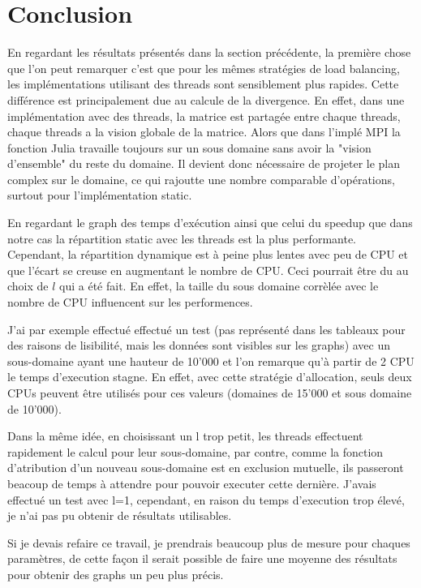\documentclass[12pt,a4paper,oneside, titlepage]{report}
\begin{document}
	\section*{Conclusion}

		En regardant les résultats présentés dans la section précédente, la première chose que l'on peut remarquer c'est que pour les mêmes stratégies de load balancing, les implémentations utilisant des threads sont sensiblement plus rapides.
		Cette différence est principalement due au calcule de la divergence. En effet, dans une implémentation avec des threads, la matrice est partagée entre chaque threads, chaque threads a la vision globale de la matrice. Alors que dans l'implé MPI la fonction Julia travaille toujours sur un sous domaine sans avoir la "vision d'ensemble" du reste du domaine. Il devient donc nécessaire de projeter le plan complex sur le domaine, ce qui rajoutte une nombre comparable d'opérations, surtout pour l'implémentation static.

		En regardant le graph des temps d'exécution ainsi que celui du speedup que dans notre cas la répartition static avec les threads est la plus performante. Cependant, la répartition dynamique est à peine plus lentes avec peu de CPU et que l'écart se creuse en augmentant le nombre de CPU.
		Ceci pourrait être du au choix de $l$ qui a été fait. En effet, la taille du sous domaine corrèlée avec le nombre de CPU influencent sur les performences.

		J'ai par exemple effectué effectué un test (pas représenté dans les tableaux pour des raisons de lisibilité, mais les données sont visibles sur les graphs) avec un sous-domaine ayant une hauteur de 10'000 et l'on remarque qu'à partir de 2 CPU le temps d'execution stagne. En effet, avec cette stratégie d'allocation, seuls deux CPUs peuvent être utilisés pour ces valeurs (domaines de 15'000 et sous domaine de 10'000).

		Dans la même idée, en choisissant un l trop petit, les threads effectuent rapidement le calcul pour leur sous-domaine, par contre, comme la fonction d'atribution d'un nouveau sous-domaine est en exclusion mutuelle, ils passeront beacoup de temps à attendre pour pouvoir executer cette dernière. J'avais effectué un test avec l=1, cependant, en raison du temps d'execution trop élevé, je n'ai pas pu obtenir de résultats utilisables.

		Si je devais refaire ce travail, je prendrais beaucoup plus de mesure pour chaques paramètres, de cette façon il serait possible de faire une moyenne des résultats pour obtenir des graphs un peu plus précis.
\end{document}
